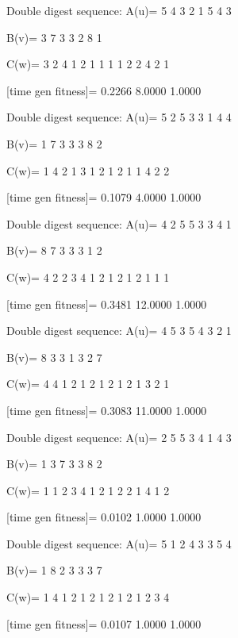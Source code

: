 Double digest sequence:
A(u)=
     5     4     3     2     1     5     4     3

B(v)=
     3     7     3     3     2     8     1

C(w)=
     3     2     4     1     2     1     1     1     1     2     2     4     2     1

[time gen fitness]=
    0.2266    8.0000    1.0000

Double digest sequence:
A(u)=
     5     2     5     3     3     1     4     4

B(v)=
     1     7     3     3     3     8     2

C(w)=
     1     4     2     1     3     1     2     1     2     1     1     4     2     2

[time gen fitness]=
    0.1079    4.0000    1.0000

Double digest sequence:
A(u)=
     4     2     5     5     3     3     4     1

B(v)=
     8     7     3     3     3     1     2

C(w)=
     4     2     2     3     4     1     2     1     2     1     2     1     1     1

[time gen fitness]=
    0.3481   12.0000    1.0000

Double digest sequence:
A(u)=
     4     5     3     5     4     3     2     1

B(v)=
     8     3     3     1     3     2     7

C(w)=
     4     4     1     2     1     2     1     2     1     2     1     3     2     1

[time gen fitness]=
    0.3083   11.0000    1.0000

Double digest sequence:
A(u)=
     2     5     5     3     4     1     4     3

B(v)=
     1     3     7     3     3     8     2

C(w)=
     1     1     2     3     4     1     2     1     2     2     1     4     1     2

[time gen fitness]=
    0.0102    1.0000    1.0000

Double digest sequence:
A(u)=
     5     1     2     4     3     3     5     4

B(v)=
     1     8     2     3     3     3     7

C(w)=
     1     4     1     2     1     2     1     2     1     2     1     2     3     4

[time gen fitness]=
    0.0107    1.0000    1.0000

